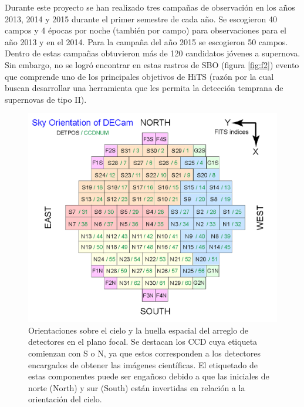 Durante este proyecto se han realizado tres campa\~nas de observaci\'on en los a\~nos 2013, 2014 y 2015 durante el primer semestre de cada a\~no. Se escogieron 40 campos y 4 \'epocas por noche (tambi\'en por campo) para observaciones para el a\~no 2013 y en el 2014. Para la campa\~na del a\~no 2015 se escogieron 50 campos. Dentro de estas campa\~nas obtuvieron m\'as de 120 candidatos j\'ovenes a supernova. Sin embargo, no se logr\'o encontrar en estas rastros de SBO (figura \ref{fig:f2}) evento que comprende uno de los principales objetivos de HiTS (raz\'on por la cual buscan desarrollar una herramienta que les permita la detecci\'on temprana de supernovas de tipo II).  

\begin{figure}
\centering
\includegraphics[scale=.75]{images/decam}
\caption{Orientaciones sobre el cielo y la huella espacial del arreglo de detectores en el plano focal. Se destacan los CCD cuya etiqueta comienzan con S o N, ya que estos corresponden a los detectores encargados de obtener las im\'agenes cient\'ificas. El etiquetado de estas componentes puede ser enga\~noso debido a que las iniciales de norte (North) y sur (South) est\'an invertidas en relaci\'on a la orientaci\'on del cielo.}
\label{fig:f4}
\end{figure}

